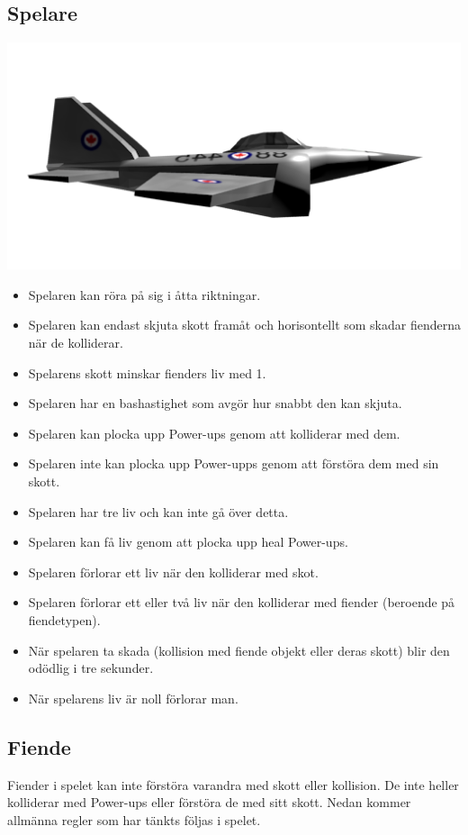 \documentclass{TDP005mall}
\begin{document}
\subsection{Spelare}
\includegraphics[scale=0.2]{Images/Player.png}
\begin{itemize}
\item Spelaren kan röra på sig i åtta riktningar.
\item Spelaren kan endast skjuta skott framåt och horisontellt som skadar fienderna när de kolliderar.
\item Spelarens skott minskar fienders liv med 1.
\item Spelaren har en bashastighet som avgör hur snabbt den kan skjuta.
\item Spelaren kan plocka upp Power-ups genom att kolliderar med dem.
\item Spelaren inte kan plocka upp Power-upps genom att förstöra dem med sin skott.
\item Spelaren har tre liv och kan inte gå över detta.
\item Spelaren kan få liv genom att plocka upp heal Power-ups.
\item Spelaren förlorar ett liv när den kolliderar med skot.
\item Spelaren förlorar ett eller två liv när den kolliderar med fiender (beroende på fiendetypen).
\item När spelaren ta skada (kollision med fiende objekt eller deras skott) blir den odödlig i tre sekunder.
\item När spelarens liv är noll förlorar man.


\end{itemize}

\subsection{Fiende}
Fiender i spelet kan inte förstöra varandra med skott eller kollision. De inte heller kolliderar med Power-ups eller förstöra de med sitt skott. Nedan kommer allmänna regler som har tänkts följas i spelet.
\end{document}

